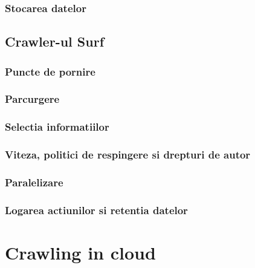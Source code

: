 \documentclass[12pt,oneside]{report}
\newcommand{\chaptertitle}[1]{\LARGE{#1}}
\begin{document}
\subsection{Stocarea datelor}

\clearpage

\section{Crawler-ul Surf}


\subsection{Puncte de pornire}


\subsection{Parcurgere}


\subsection{Selectia informatiilor}


\subsection{Viteza, politici de respingere si drepturi de autor}


\subsection{Paralelizare}


\subsection{Logarea actiunilor si retentia datelor}

\clearpage

\chapter*{\chaptertitle{Crawling in cloud}}

\clearpage
\end{document}
